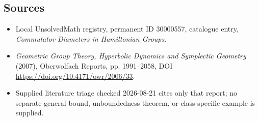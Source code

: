 \documentclass[11pt]{article}
\begin{document}
\subsection{Sources}
\begin{itemize}
\item Local UnsolvedMath registry, permanent ID 30000557, catalogue entry, \emph{Commutator Diameters in Hamiltonian Groups}.
\item \emph{Geometric Group Theory, Hyperbolic Dynamics and Symplectic Geometry} (2007), Oberwolfach Reports, pp. 1991--2058, DOI \url{https://doi.org/10.4171/owr/2006/33}.
\item Supplied literature triage checked 2026-08-21 cites only that report; no separate general bound, unboundedness theorem, or class-specific example is supplied.
\end{itemize}
\end{document}
